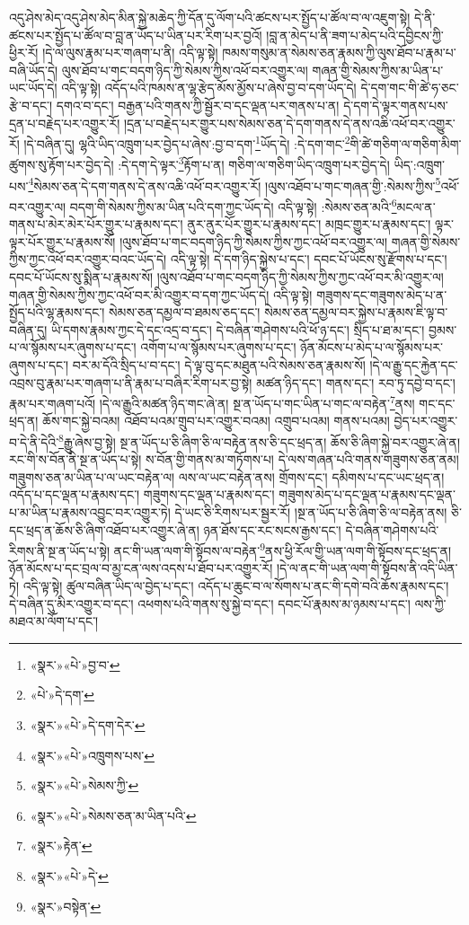 འདུ་ཤེས་མེད་འདུ་ཤེས་མེད་མིན་སྐྱེ་མཆེད་ཀྱི་དོན་དུ་ལོག་པའི་ཚངས་པར་སྤྱོད་པ་ཚོལ་བ་ལ་འཇུག་སྟེ། དེ་ནི་ཚངས་པར་སྤྱོད་པ་ཚོལ་བ་བླ་ན་ཡོད་པ་ཡིན་པར་རིག་པར་བྱའོ། །བླ་ན་མེད་པ་ནི་ཟག་པ་མེད་པའི་དབྱིངས་ཀྱི་ཕྱིར་རོ། །དེ་ལ་ལུས་རྣམ་པར་གཞག་པ་ནི། འདི་ལྟ་སྟེ། ཁམས་གསུམ་ན་སེམས་ཅན་རྣམས་ཀྱི་ལུས་ཐོབ་པ་རྣམ་པ་བཞི་ཡོད་དེ། ལུས་ཐོབ་པ་གང་བདག་ཉིད་ཀྱི་སེམས་ཀྱིས་འཕོ་བར་འགྱུར་ལ། གཞན་གྱི་སེམས་ཀྱིས་མ་ཡིན་པ་ཡང་ཡོད་དེ། འདི་ལྟ་སྟེ། འདོད་པའི་ཁམས་ན་ལྷ་རྩེད་མོས་མྱོས་པ་ཞེས་བྱ་བ་དག་ཡོད་དེ། དེ་དག་གང་གི་ཚེ་ཧ་ཅང་རྩེ་བ་དང་། དགའ་བ་དང་། བརྒྱན་པའི་གནས་ཀྱི་སྦྱོར་བ་དང་ལྡན་པར་གནས་པ་ན། དེ་དག་དེ་ལྟར་གནས་པས་དྲན་པ་བརྗེད་པར་འགྱུར་རོ། །དྲན་པ་བརྗེད་པར་གྱུར་པས་སེམས་ཅན་དེ་དག་གནས་དེ་ནས་འཆི་འཕོ་བར་འགྱུར་རོ། །དེ་བཞིན་དུ། ལྷའི་ཡིད་འཁྲུག་པར་བྱེད་པ་ཞེས་:བྱ་བ་དག་\footnote{«སྣར་»«པེ་»བྱ་བ་}ཡོད་དེ། :དེ་དག་གང་\footnote{«པེ་»དེ་དག་}གི་ཚེ་གཅིག་ལ་གཅིག་མིག་ཚུགས་སུ་རྟོག་པར་བྱེད་དེ། :དེ་དག་དེ་ལྟར་\footnote{«སྣར་»«པེ་»དེ་དག་དེར་}རྟོག་པ་ན། གཅིག་ལ་གཅིག་ཡིད་འཁྲུག་པར་བྱེད་དེ། ཡིད་:འཁྲུག་པས་\footnote{«སྣར་»«པེ་»འཁྲུགས་པས་}སེམས་ཅན་དེ་དག་གནས་དེ་ནས་འཆི་འཕོ་བར་འགྱུར་རོ། །ལུས་འཐོབ་པ་གང་གཞན་གྱི་:སེམས་ཀྱིས་\footnote{«སྣར་»«པེ་»སེམས་ཀྱི་}འཕོ་བར་འགྱུར་ལ། བདག་གི་སེམས་ཀྱིས་མ་ཡིན་པའི་དག་ཀྱང་ཡོད་དེ། འདི་ལྟ་སྟེ། :སེམས་ཅན་མའི་\footnote{«སྣར་»«པེ་»སེམས་ཅན་མ་ཡིན་པའི་}མངལ་ན་གནས་པ་མེར་མེར་པོར་གྱུར་པ་རྣམས་དང་། ནུར་ནུར་པོར་གྱུར་པ་རྣམས་དང་། མཁྲང་གྱུར་པ་རྣམས་དང་། ལྟར་ལྟར་པོར་གྱུར་པ་རྣམས་སོ། །ལུས་ཐོབ་པ་གང་བདག་ཉིད་ཀྱི་སེམས་ཀྱིས་ཀྱང་འཕོ་བར་འགྱུར་ལ། གཞན་གྱི་སེམས་ཀྱིས་ཀྱང་འཕོ་བར་འགྱུར་བའང་ཡོད་དེ། འདི་ལྟ་སྟེ། དེ་དག་ཉིད་སྐྱེས་པ་དང་། དབང་པོ་ཡོངས་སུ་རྫོགས་པ་དང་། དབང་པོ་ཡོངས་སུ་སྨིན་པ་རྣམས་སོ། །ལུས་འཐོབ་པ་གང་བདག་ཉིད་ཀྱི་སེམས་ཀྱིས་ཀྱང་འཕོ་བར་མི་འགྱུར་ལ། གཞན་གྱི་སེམས་ཀྱིས་ཀྱང་འཕོ་བར་མི་འགྱུར་བ་དག་ཀྱང་ཡོད་དེ། འདི་ལྟ་སྟེ། གཟུགས་དང་གཟུགས་མེད་པ་ན་སྤྱོད་པའི་ལྷ་རྣམས་དང་། སེམས་ཅན་དམྱལ་བ་ཐམས་ཅད་དང་། སེམས་ཅན་དམྱལ་བར་སྐྱེས་པ་རྣམས་ཇི་ལྟ་བ་བཞིན་དུ། ཡི་དགས་རྣམས་ཀྱང་དེ་དང་འདྲ་བ་དང་། དེ་བཞིན་གཤེགས་པའི་ཕོ་ཉ་དང་། སྲིད་པ་ཐ་མ་དང་། བྱམས་པ་ལ་སྙོམས་པར་ཞུགས་པ་དང་། འགོག་པ་ལ་སྙོམས་པར་ཞུགས་པ་དང་། ཉོན་མོངས་པ་མེད་པ་ལ་སྙོམས་པར་ཞུགས་པ་དང་། བར་མ་དོའི་སྲིད་པ་བ་དང་། དེ་ལྟ་བུ་དང་མཐུན་པའི་སེམས་ཅན་རྣམས་སོ། །དེ་ལ་རྒྱུ་དང་རྐྱེན་དང་འབྲས་བུ་རྣམ་པར་གཞག་པ་ནི་རྣམ་པ་བཞིར་རིག་པར་བྱ་སྟེ། མཚན་ཉིད་དང་། གནས་དང་། རབ་ཏུ་དབྱེ་བ་དང་། རྣམ་པར་གཞག་པའོ། །དེ་ལ་རྒྱུའི་མཚན་ཉིད་གང་ཞེ་ན། སྔ་ན་ཡོད་པ་གང་ཡིན་པ་གང་ལ་བརྟེན་\footnote{«སྣར་»རྟེན་}ནས། གང་དང་ཕྲད་ན། ཆོས་གང་སྐྱེ་བའམ། འཐོབ་པའམ་གྲུབ་པར་འགྱུར་བའམ། འགྲུབ་པའམ། གནས་པའམ། བྱེད་པར་འགྱུར་བ་དེ་ནི་དེའི་\footnote{«སྣར་»«པེ་»དེ་}རྒྱུ་ཞེས་བྱ་སྟེ། སྔ་ན་ཡོད་པ་ཅི་ཞིག་ཅི་ལ་བརྟེན་ནས་ཅི་དང་ཕྲད་ན། ཆོས་ཅི་ཞིག་སྐྱེ་བར་འགྱུར་ཞེ་ན། རང་གི་ས་བོན་ནི་སྔ་ན་ཡོད་པ་སྟེ། ས་བོན་གྱི་གནས་མ་གཏོགས་པ། དེ་ལས་གཞན་པའི་གནས་གཟུགས་ཅན་ནམ། གཟུགས་ཅན་མ་ཡིན་པ་ལ་ཡང་བརྟེན་ལ། ལས་ལ་ཡང་བརྟེན་ནས། གྲོགས་དང་། དམིགས་པ་དང་ཡང་ཕྲད་ན། འདོད་པ་དང་ལྡན་པ་རྣམས་དང་། གཟུགས་དང་ལྡན་པ་རྣམས་དང་། གཟུགས་མེད་པ་དང་ལྡན་པ་རྣམས་དང་ལྡན་པ་མ་ཡིན་པ་རྣམས་འབྱུང་བར་འགྱུར་ཏེ། དེ་ཡང་ཅི་རིགས་པར་སྦྱར་རོ། །སྔ་ན་ཡོད་པ་ཅི་ཞིག་ཅི་ལ་བརྟེན་ནས། ཅི་དང་ཕྲད་ན་ཆོས་ཅི་ཞིག་འཐོབ་པར་འགྱུར་ཞེ་ན། ཉན་ཐོས་དང་རང་སངས་རྒྱས་དང་། དེ་བཞིན་གཤེགས་པའི་རིགས་ནི་སྔ་ན་ཡོད་པ་སྟེ། ནང་གི་ཡན་ལག་གི་སྟོབས་ལ་བརྟེན་\footnote{«སྣར་»བསྟེན་}ནས་ཕྱི་རོལ་གྱི་ཡན་ལག་གི་སྟོབས་དང་ཕྲད་ན། ཉོན་མོངས་པ་དང་བྲལ་བ་མྱ་ངན་ལས་འདས་པ་ཐོབ་པར་འགྱུར་རོ། །དེ་ལ་ནང་གི་ཡན་ལག་གི་སྟོབས་ནི་འདི་ཡིན་ཏེ། འདི་ལྟ་སྟེ། ཚུལ་བཞིན་ཡིད་ལ་བྱེད་པ་དང་། འདོད་པ་ཆུང་བ་ལ་སོགས་པ་ནང་གི་དགེ་བའི་ཆོས་རྣམས་དང་། དེ་བཞིན་དུ་མིར་འགྱུར་བ་དང་། འཕགས་པའི་གནས་སུ་སྐྱེ་བ་དང་། དབང་པོ་རྣམས་མ་ཉམས་པ་དང་། ལས་ཀྱི་མཐའ་མ་ལོག་པ་དང་། 